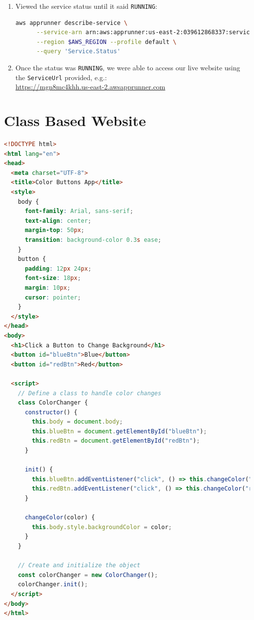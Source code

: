 \begin{enumerate}
    \item Viewed the service status until it said \texttt{RUNNING}:
    \begin{lstlisting}[language=bash]
    aws apprunner describe-service \
      --service-arn arn:aws:apprunner:us-east-2:039612868337:service/my-apprunner-app/645d0eab8242460da212316afafce4ec \
      --region $AWS_REGION --profile default \
      --query 'Service.Status'
    \end{lstlisting}

    \item Once the status was \texttt{RUNNING}, we were able to access our live website using the \texttt{ServiceUrl} provided, e.g.:\\
    
    \url{https://mgn8mc4khh.us-east-2.awsapprunner.com}
\end{enumerate}



\section{Class Based Website}


\begin{lstlisting}[language=HTML]
<!DOCTYPE html>
<html lang="en">
<head>
  <meta charset="UTF-8">
  <title>Color Buttons App</title>
  <style>
    body {
      font-family: Arial, sans-serif;
      text-align: center;
      margin-top: 50px;
      transition: background-color 0.3s ease;
    }
    button {
      padding: 12px 24px;
      font-size: 18px;
      margin: 10px;
      cursor: pointer;
    }
  </style>
</head>
<body>
  <h1>Click a Button to Change Background</h1>
  <button id="blueBtn">Blue</button>
  <button id="redBtn">Red</button>

  <script>
    // Define a class to handle color changes
    class ColorChanger {
      constructor() {
        this.body = document.body;
        this.blueBtn = document.getElementById("blueBtn");
        this.redBtn = document.getElementById("redBtn");
      }

      init() {
        this.blueBtn.addEventListener("click", () => this.changeColor("blue"));
        this.redBtn.addEventListener("click", () => this.changeColor("red"));
      }

      changeColor(color) {
        this.body.style.backgroundColor = color;
      }
    }

    // Create and initialize the object
    const colorChanger = new ColorChanger();
    colorChanger.init();
  </script>
</body>
</html>
\end{lstlisting}


